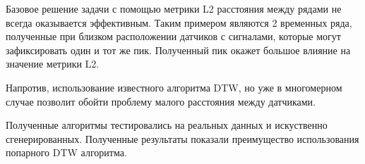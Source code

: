 \documentclass[12pt, twoside]{article}
\begin{document}
Базовое решение задачи с помощью метрики L2 расстояния между рядами не всегда оказывается эффективным. Таким примером являются 2 временных ряда, полученные при близком расположении датчиков с сигналами, которые могут зафиксировать один и тот же пик. Полученный пик окажет большое влияние на значение метрики L2.

Напротив, использование известного алгоритма DTW, но уже в многомерном случае позволит обойти проблему малого расстояния между датчиками.

Полученные алгоритмы тестировались на реальных данных и искуственно  сгенерированных. Полученные результаты показали преимущество использования попарного DTW алгоритма.
 


\end{document}
